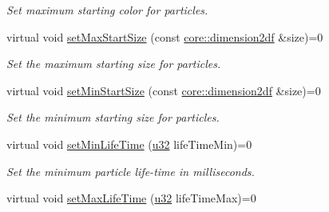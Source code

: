 \begin{DoxyCompactItemize}
\begin{DoxyCompactList}\small\item\em Set maximum starting color for particles. \end{DoxyCompactList}\item 
\mbox{\label{classirr_1_1scene_1_1IParticleEmitter_ab395cff6fc4910e437876aca1edc348c}} 
virtual void \hyperlink{classirr_1_1scene_1_1IParticleEmitter_ab395cff6fc4910e437876aca1edc348c}{set\+Max\+Start\+Size} (const \hyperlink{namespaceirr_1_1core_a54f0e5b7416e6dce5a0f6213f00a580f}{core\+::dimension2df} \&size)=0
\begin{DoxyCompactList}\small\item\em Set the maximum starting size for particles. \end{DoxyCompactList}\item 
\mbox{\label{classirr_1_1scene_1_1IParticleEmitter_a05fdfbf05ef3b86304e55b1712c12725}} 
virtual void \hyperlink{classirr_1_1scene_1_1IParticleEmitter_a05fdfbf05ef3b86304e55b1712c12725}{set\+Min\+Start\+Size} (const \hyperlink{namespaceirr_1_1core_a54f0e5b7416e6dce5a0f6213f00a580f}{core\+::dimension2df} \&size)=0
\begin{DoxyCompactList}\small\item\em Set the minimum starting size for particles. \end{DoxyCompactList}\item 
\mbox{\label{classirr_1_1scene_1_1IParticleEmitter_a568914da28fc4f38e792de56aa0ad1e0}} 
virtual void \hyperlink{classirr_1_1scene_1_1IParticleEmitter_a568914da28fc4f38e792de56aa0ad1e0}{set\+Min\+Life\+Time} (\hyperlink{namespaceirr_a0416a53257075833e7002efd0a18e804}{u32} life\+Time\+Min)=0
\begin{DoxyCompactList}\small\item\em Set the minimum particle life-\/time in milliseconds. \end{DoxyCompactList}\item 
\mbox{\label{classirr_1_1scene_1_1IParticleEmitter_a607631549dba3328b5093e6f02e47cd8}} 
virtual void \hyperlink{classirr_1_1scene_1_1IParticleEmitter_a607631549dba3328b5093e6f02e47cd8}{set\+Max\+Life\+Time} (\hyperlink{namespaceirr_a0416a53257075833e7002efd0a18e804}{u32} life\+Time\+Max)=0

\end{DoxyCompactItemize}
